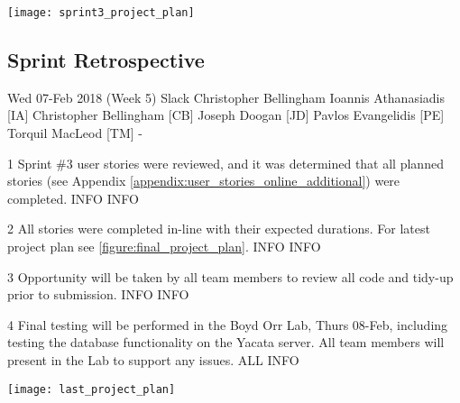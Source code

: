 \begin{center}
	\texttt{[image: sprint3\_project\_plan]}
	\label{figure:sprint3_project_plan}
\end{center}


\newpage
\subsection{Sprint Retrospective}
\label{appendix:final_sprint_meeting}

\momtoptable
{Wed 07-Feb 2018 (Week 5)}
{Slack}
{Christopher Bellingham}
{Ioannis Athanasiadis [IA]\newline
Christopher Bellingham [CB]\newline
Joseph Doogan [JD]\newline
Pavlos Evangelidis [PE]\newline
Torquil MacLeod [TM]}
{-}

\begin{momitems}
	\momitem
	{1}
	{Sprint \#3 user stories were reviewed, and it was determined that all planned stories (see Appendix \ref{appendix:user_stories_online_additional}) were completed.}
	{INFO}
	{INFO}

	\momitem
	{2}
	{All stories were completed in-line with their expected durations. For latest project plan see \ref{figure:final_project_plan}.}
	{INFO}
	{INFO}
	
	\momitem
	{3}
	{Opportunity will be taken by all team members to review all code and tidy-up prior to submission.}
	{INFO}
	{INFO}

	\momitem
	{4}
	{Final testing will be performed in the Boyd Orr Lab, Thurs 08-Feb, including testing the database functionality on the Yacata server.
	All team members will present in the Lab to support any issues.}
	{ALL}
	{INFO}
\end{momitems}

\begin{center}
	\texttt{[image: last\_project\_plan]}
	\label{figure:final_project_plan}
\end{center}